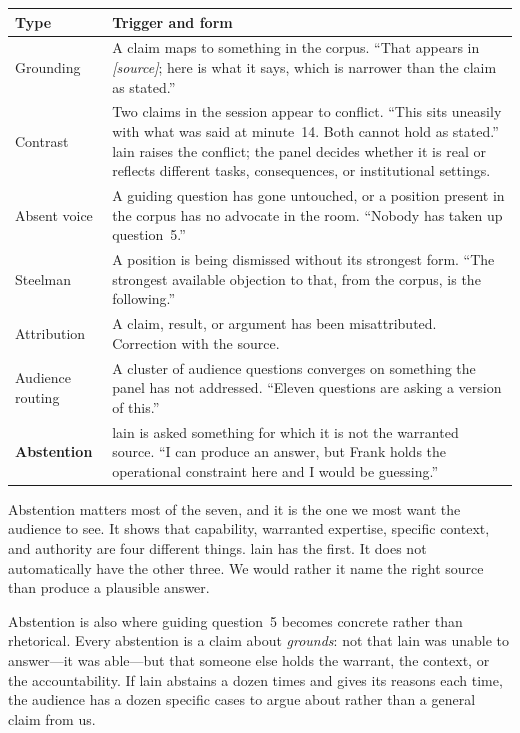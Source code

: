 \documentclass[11pt]{article}
\begin{document}
\vspace{0.4em}
\noindent\begin{tabularx}{\linewidth}{@{}L{2.9cm}Y@{}}
\toprule
\textbf{Type} & \textbf{Trigger and form} \\
\midrule
Grounding & A claim maps to something in the corpus. ``That appears in
\emph{[source]}; here is what it says, which is narrower than the claim as
stated.'' \\
\addlinespace[0.4em]
Contrast & Two claims in the session appear to conflict. ``This sits uneasily
with what was said at minute~14. Both cannot hold as stated.'' lain raises the
conflict; the panel decides whether it is real or reflects different tasks,
consequences, or institutional settings. \\
\addlinespace[0.4em]
Absent voice & A guiding question has gone untouched, or a position present in
the corpus has no advocate in the room. ``Nobody has taken up question~5.'' \\
\addlinespace[0.4em]
Steelman & A position is being dismissed without its strongest form. ``The
strongest available objection to that, from the corpus, is the following.'' \\
\addlinespace[0.4em]
Attribution & A claim, result, or argument has been misattributed. Correction
with the source. \\
\addlinespace[0.4em]
Audience routing & A cluster of audience questions converges on something the
panel has not addressed. ``Eleven questions are asking a version of this.'' \\
\addlinespace[0.4em]
\textbf{Abstention} & lain is asked something for which it is not the warranted
source. ``I can produce an answer, but Frank holds the operational constraint
here and I would be guessing.'' \\
\bottomrule
\end{tabularx}

\vspace{0.6em}

Abstention matters most of the seven, and it is the one we most want the
audience to see. It shows that capability, warranted expertise, specific
context, and authority are four different things. lain has the first. It does
not automatically have the other three. We would rather it name the right source
than produce a plausible answer.

Abstention is also where guiding question~5 becomes concrete rather than
rhetorical. Every abstention is a claim about \emph{grounds}: not that lain was
unable to answer---it was able---but that someone else holds the warrant, the
context, or the accountability. If lain abstains a dozen times and gives its
reasons each time, the audience has a dozen specific cases to argue about rather
than a general claim from us.
\end{document}
